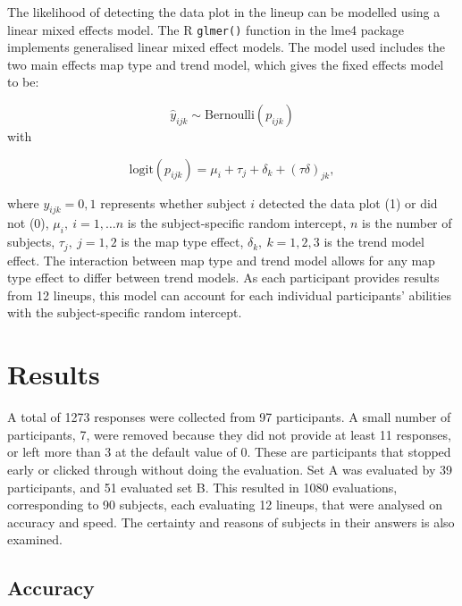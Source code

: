 \documentclass[
doublespace,
  times]{anzsauth}
\begin{document}
The likelihood of detecting the data plot in the lineup can be modelled
using a linear mixed effects model. The \textsf{R} \texttt{glmer()}
function in the \textsf{lme4} \citep{lme4} package implements
generalised linear mixed effect models. The model used includes the two
main effects map type and trend model, which gives the fixed effects
model to be:

\[
\hat{y}_{ijk} \sim \text{Bernoulli}(p_{ijk})
\] with

\[
\text{logit}(p_{ijk}) = \mu_i + \tau_j + \delta_k + (\tau \delta)_{jk},
\]

where \(y_{ijk} = 0, 1\) represents whether subject \(i\) detected the
data plot (1) or did not (0), \(\mu_i, ~i=1, \dots n\) is the
subject-specific random intercept, \(n\) is the number of subjects,
\(\tau_j, ~j=1,2\) is the map type effect, \(\delta_k, ~k=1,2,3\) is the
trend model effect. The interaction between map type and trend model
allows for any map type effect to differ between trend models. As each
participant provides results from 12 lineups, this model can account for
each individual participants' abilities with the subject-specific random
intercept.

\section{Results}\label{sec-results}

A total of 1273 responses were collected from 97 participants. A small
number of participants, 7, were removed because they did not provide at
least 11 responses, or left more than 3 at the default value of 0. These
are participants that stopped early or clicked through without doing the
evaluation. Set A was evaluated by 39 participants, and 51 evaluated set
B. This resulted in 1080 evaluations, corresponding to 90 subjects, each
evaluating 12 lineups, that were analysed on accuracy and speed. The
certainty and reasons of subjects in their answers is also examined.

\subsection{Accuracy}\label{accuracy}
\end{document}

